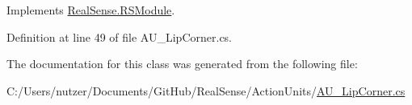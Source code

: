 Implements \hyperlink{class_real_sense_1_1_r_s_module_a2ec830b7932ee7c0077d473f81c73867}{Real\+Sense.\+R\+S\+Module}.



Definition at line 49 of file A\+U\+\_\+\+Lip\+Corner.\+cs.



The documentation for this class was generated from the following file\+:\begin{DoxyCompactItemize}
\item 
C\+:/\+Users/nutzer/\+Documents/\+Git\+Hub/\+Real\+Sense/\+Action\+Units/\hyperlink{_a_u___lip_corner_8cs}{A\+U\+\_\+\+Lip\+Corner.\+cs}\end{DoxyCompactItemize}
